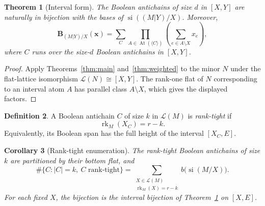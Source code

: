 \documentclass[11pt]{article}
\newtheorem{theorem}{Theorem}[section]
\newtheorem{corollary}[theorem]{Corollary}
\theoremstyle{definition}
\newtheorem{definition}[theorem]{Definition}
\theoremstyle{remark}
\newcommand{\rk}{\operatorname{rk}}
\newcommand{\si}{\operatorname{si}}
\newcommand{\cL}{\mathcal L}
\begin{document}
\begin{theorem}[Interval form]\label{thm:interval}
The Boolean antichains of size $d$ in $[X,Y]$ are naturally in bijection with
the bases of $\si((M|Y)/X)$.
Moreover,
\begin{equation}\label{eq:interval-weighted}
 \mathbf B_{(M|Y)/X}(\mathbf x)
 =\sum_C\prod_{A\in\operatorname{At}(\langle C\rangle)}
       \left(\sum_{e\in A\setminus X}x_e\right),
\end{equation}
where $C$ runs over the size-$d$ Boolean antichains in $[X,Y]$.
\end{theorem}

\begin{proof}
Apply Theorems~\ref{thm:main} and~\ref{thm:weighted} to the minor $N$ under
the flat-lattice isomorphism $\cL(N)\cong[X,Y]$.
The rank-one flat of $N$
corresponding to an interval atom $A$ has parallel class $A\setminus X$,
which gives the displayed factors.
\end{proof}

\begin{definition}
A Boolean antichain $C$ of size $k$ in $\cL(M)$ is \emph{rank-tight} if
\[
 \rk_M(X_C)=r-k.
\]
Equivalently, its Boolean span has the full height of the interval
$[X_C,E]$.
\end{definition}

\begin{corollary}[Rank-tight enumeration]\label{cor:rank-tight}
The rank-tight Boolean antichains of size $k$ are partitioned by their bottom
flat,
and
\begin{equation}\label{eq:rank-tight}
 \#\{C:|C|=k,\ C\text{ rank-tight}\}
 =\sum_{\substack{X\in\cL(M)\\\rk_M(X)=r-k}}
   b\bigl(\si(M/X)\bigr).
\end{equation}
For each fixed $X$, the bijection is the interval bijection of
Theorem~\ref{thm:interval} on $[X,E]$.
\end{corollary}
\end{document}
